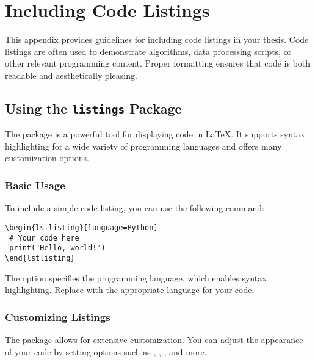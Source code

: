\chapter{Including Code Listings}\label{app:codelistings}
	This appendix provides guidelines for including code listings in your thesis. 
	Code listings are often used to demonstrate algorithms, data processing scripts, or other relevant programming content. 
	Proper formatting ensures that code is both readable and aesthetically pleasing.

	\section{Using the \texttt{listings} Package}
		The  package is a powerful tool for displaying code in LaTeX. 
		It supports syntax highlighting for a wide variety of programming languages and offers many customization options.

		\subsection{Basic Usage}

			To include a simple code listing, you can use the following command:

\noindent\lstinline|\begin{lstlisting}[language=Python]|\\[-0.7em]
\lstinline|	# Your code here|\\[-0.7em]
\lstinline|	print("Hello, world!")|\\[-0.7em]
\lstinline|\end{lstlisting}|

			The  option specifies the programming language, which enables syntax highlighting. 
			Replace  with the appropriate language for your code.


		\subsection{Customizing Listings}

			The  package allows for extensive customization. 
			You can adjust the appearance of your code by setting options such as , , , and more.

